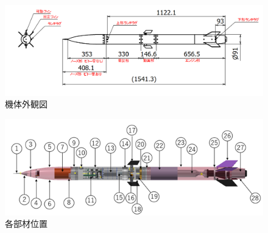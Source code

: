 \documentclass[a4paper,11pt,uplatex]{jsarticle}
\begin{document}
\begin{figure}[H]
	\centering
	\includegraphics[width=1.1\linewidth]{pic_str/s_sunpou.png}
	\caption{機体外観図}
	\label{s_gaikei}
\end{figure}

\begin{figure}[H]
	\centering
	\includegraphics{pic_str/s_iti.png}
	\caption{各部材位置}
	\label{s_iti}
\end{figure}
\end{document}
